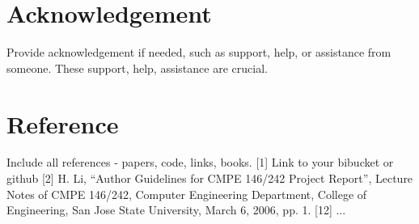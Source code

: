 \documentclass{article}
\begin{document}
\begin{multicols}{2}
\section{Acknowledgement}
Provide acknowledgement if needed, such as support, help, or assistance from someone. These support, help, assistance are crucial.

\section{Reference}
Include all references - papers, code, links, books.
[1] Link to your bibucket or github
[2] H. Li,  “Author Guidelines for CMPE 146/242 Project Report”, Lecture Notes of CMPE 146/242, Computer Engineering Department, College of Engineering, San Jose State University, March 6, 2006, pp. 1.
[12] ...






\end{multicols}
\end{document}
